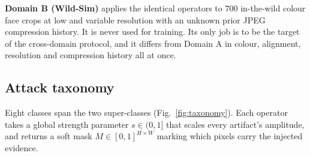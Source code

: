 \documentclass[conference]{IEEEtran}
\begin{document}
\textbf{Domain B (Wild-Sim)} applies the identical operators to $700$ in-the-wild
colour face crops at low and variable resolution with an unknown prior JPEG
compression history. It is never used for training. Its only job is to be the target
of the cross-domain protocol, and it differs from Domain A in colour, alignment,
resolution and compression history all at once.

\subsection{Attack taxonomy}
Eight classes span the two super-classes (Fig.~\ref{fig:taxonomy}). Each operator
takes a global strength parameter $s\in(0,1]$ that scales every artifact's
amplitude, and returns a soft mask $M\in[0,1]^{H\times W}$ marking which pixels
carry the injected evidence.
\end{document}
